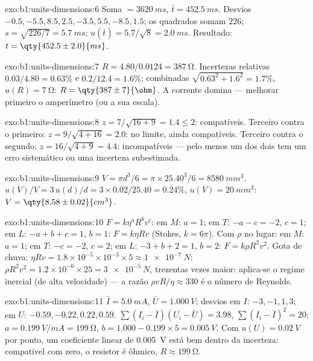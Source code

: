 \begin{solution}{exo:b1:units-dimensions:6}
Soma $= \qty{3620}{ms}$, $\bar t = \qty{452.5}{ms}$. Desvios
$-0.5, -5.5, 8.5, 2.5, -3.5, 5.5, -8.5, 1.5$; os quadrados somam $226$;
$s = \sqrt{226/7} = \qty{5.7}{ms}$; $u(\bar t) = 5.7/\sqrt8 = \qty{2.0}{ms}$.
Resultado: $t = \qty{452.5\pm2.0}{ms}$.
\end{solution}

\begin{solution}{exo:b1:units-dimensions:7}
$R = 4.80/0.0124 = \qty{387}{\ohm}$. Incertezas relativas $0.03/4.80 =
0.63\%$ e $0.2/12.4 = 1.6\%$; combinadas $\sqrt{0.63^2 + 1.6^2} = 1.7\%$,
$u(R) = \qty{7}{\ohm}$: $R = \qty{387\pm7}{\ohm}$. A corrente
domina --- melhorar primeiro o amperímetro (ou a sua escala).
\end{solution}

\begin{solution}{exo:b1:units-dimensions:8}
$z = 7/\sqrt{16 + 9} = 1.4 \leq 2$: compatíveis.
Terceiro contra o primeiro: $z = 9/\sqrt{4 + 16} = 2.0$: no limite, ainda
compatíveis. Terceiro contra o segundo: $z = 16/\sqrt{4 + 9} = 4.4$: incompatíveis
--- pelo menos um dos dois tem um erro sistemático ou uma
incerteza subestimada.
\end{solution}

\begin{solution}{exo:b1:units-dimensions:9}
$V = \pi d^3/6 = \pi \times 25.40^3/6 = \qty{8580}{mm^3}$.
$u(V)/V = 3\,u(d)/d = 3 \times 0.02/25.40 = 0.24\%$,
$u(V) = \qty{20}{mm^3}$: $V = \qty{8.58\pm0.02}{cm^3}$.
\end{solution}

\begin{solution}{exo:b1:units-dimensions:10}
$F = k\eta^a R^b v^c$: em $M$: $a = 1$; em $T$: $-a - c = -2$, $c = 1$;
em $L$: $-a + b + c = 1$, $b = 1$: $F = k\eta R v$ (Stokes, $k = 6\pi$).
Com $\rho$ no lugar: em $M$: $a = 1$; em $T$: $-c = -2$, $c = 2$; em $L$:
$-3 + b + 2 = 1$, $b = 2$: $F = k\rho R^2 v^2$.
Gota de chuva: $\eta R v = 1.8\times10^{-5} \times 10^{-3} \times 5 \approx
\qty{1e-7}{N}$; $\rho R^2 v^2 = 1.2 \times 10^{-6} \times 25 =
\qty{3e-5}{N}$, trezentas vezes maior: aplica-se o regime inercial (de
alta velocidade) --- a razão $\rho v R/\eta \approx 330$ é o número de
Reynolds.
\end{solution}

\begin{solution}{exo:b1:units-dimensions:11}
$\bar I = \qty{5.0}{mA}$, $\bar U = \qty{1.000}{V}$; desvios em $I$:
$-3, -1, 1, 3$; em $U$: $-0.59, -0.22, 0.22, 0.59$.
$\sum (I_i - \bar I)(U_i - \bar U) = 3.98$, $\sum (I_i - \bar I)^2 = 20$:
$a = \qty{0.199}{V/mA} = \qty{199}{\ohm}$, $b = 1.000 - 0.199 \times 5 =
\qty{0.005}{V}$. Com $u(U) = \qty{0.02}{V}$ por ponto, um coeficiente linear de
\qty{0.005}{V} está bem dentro da incerteza: compatível com zero, o
resistor é ôhmico, $R \approx \qty{199}{\ohm}$.
\end{solution}

